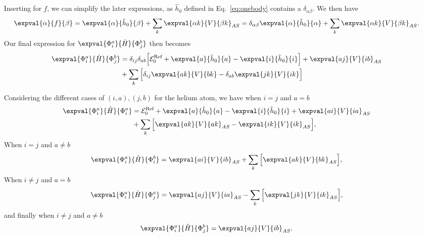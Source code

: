 Inserting for $f$, we can simplify the later expressions, as $\hat{h}_0$ defined in Eq.~\eqref{eq:onebody} contains a $\delta_{\alpha \beta}$.
We then have
\begin{equation*}
    \expval{\alpha}{f}{\beta} = \expval{\alpha}{\hat{h}_0}{\beta} + \sum_{k} \expval{\alpha k}{V}{\beta k}_{AS} = \delta_{\alpha \beta} \expval{\alpha}{\hat{h}_0}{\alpha} + \sum_{k} \expval{\alpha k}{V}{\beta k}_{AS}.
\end{equation*}
Our final expression for $\expval{\Phi_i^a}{\hat{H}}{\Phi_{j}^{b}}$ then becomes
\begin{align*}
    \expval{\Phi_i^a}{\hat{H}}{\Phi_{j}^{b}} &= \delta_{ij} \delta_{ab} \Big[ \mathcal{E}_0^{\text{Ref}} + \expval{a}{\hat{h}_0}{a}  - \expval{i}{\hat{h}_0}{i} \Big] + \expval{aj}{V}{ib}_{AS} \\
    &+ \sum_{k} \Big[ \delta_{ij} \expval{ak}{V}{bk} - \delta_{ab} \expval{jk}{V}{ik} \Big]
\end{align*}

Considering the different cases of $(i, a), (j, b)$ for the helium atom, we have when $i = j$ and $a = b$
\begin{align*}
    \expval{\Phi_i^a}{\hat{H}}{\Phi_i^a} &= \mathcal{E}_0^{\text{Ref}} + \expval{a}{\hat{h}_0}{a} - \expval{i}{\hat{h}_0}{i} + \expval{ai}{V}{ia}_{AS}  \\
    &+ \sum_{k} \Big[ \expval{ak}{V}{ak}_{AS} - \expval{ik}{V}{ik}_{AS} \Big],
\end{align*}
When $i = j$ and $a \neq b$
\begin{equation*}
    \expval{\Phi_i^a}{\hat{H}}{\Phi_i^b} = \expval{ai}{V}{ib}_{AS} + \sum_k \Big[ \expval{ak}{V}{bk}_{AS} \Big],
\end{equation*}
When $i \neq j$ and $a = b$
\begin{equation*}
    \expval{\Phi_i^a}{\hat{H}}{\Phi_j^a} = \expval{aj}{V}{ia}_{AS} - \sum_k \Big[ \expval{jk}{V}{ik}_{AS} \Big],
\end{equation*}
and finally when $i \neq j$ and $a \neq b$
\begin{equation*}
    \expval{\Phi_i^a}{\hat{H}}{\Phi_j^b} = \expval{aj}{V}{ib}_{AS}.
\end{equation*}

